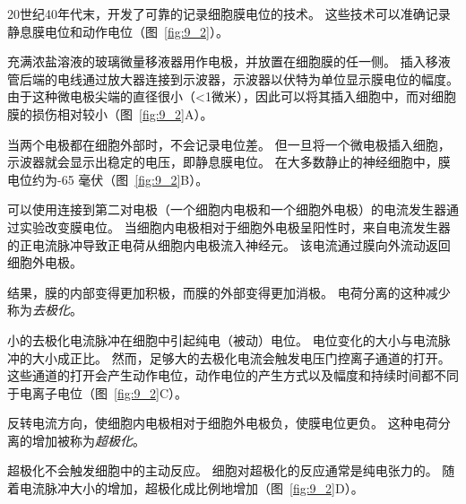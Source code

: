 \begin{proposition}[记录膜电位] \label{box:9_1}
	
	\quad \quad 20世纪40年代末，开发了可靠的记录细胞膜电位的技术。
	这些技术可以准确记录静息膜电位和动作电位（图~\ref{fig:9_2}）。
	
	\quad \quad 充满浓盐溶液的玻璃微量移液器用作电极，并放置在细胞膜的任一侧。
	插入移液管后端的电线通过放大器连接到示波器，示波器以伏特为单位显示膜电位的幅度。
	由于这种微电极尖端的直径很小（<1微米），因此可以将其插入细胞中，而对细胞膜的损伤相对较小（图~\ref{fig:9_2}A）。
	
	\quad \quad 当两个电极都在细胞外部时，不会记录电位差。
	但一旦将一个微电极插入细胞，示波器就会显示出稳定的电压，即静息膜电位。
	在大多数静止的神经细胞中，膜电位约为-65 毫伏（图~\ref{fig:9_2}B）。
	
	\quad \quad 可以使用连接到第二对电极（一个细胞内电极和一个细胞外电极）的电流发生器通过实验改变膜电位。
	当细胞内电极相对于细胞外电极呈阳性时，来自电流发生器的正电流脉冲导致正电荷从细胞内电极流入神经元。
	该电流通过膜向外流动返回细胞外电极。
	
	\quad \quad 结果，膜的内部变得更加积极，而膜的外部变得更加消极。
	电荷分离的这种减少称为\textit{去极化}。
	
	\quad \quad 小的去极化电流脉冲在细胞中引起纯电（被动）电位。
	电位变化的大小与电流脉冲的大小成正比。
	然而，足够大的去极化电流会触发电压门控离子通道的打开。
	这些通道的打开会产生动作电位，动作电位的产生方式以及幅度和持续时间都不同于电离子电位（图~\ref{fig:9_2}C）。
	
	\quad \quad 反转电流方向，使细胞内电极相对于细胞外电极负，使膜电位更负。
	这种电荷分离的增加被称为\textit{超极化}。
	
	\quad \quad 超极化不会触发细胞中的主动反应。
	细胞对超极化的反应通常是纯电张力的。
	随着电流脉冲大小的增加，超极化成比例地增加（图~\ref{fig:9_2}D）。

	
\end{proposition}


